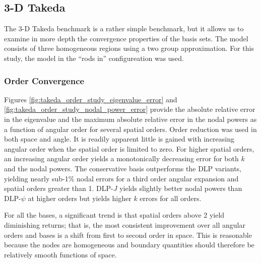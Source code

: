 \subsection{3-D Takeda}

The 3-D Takeda benchmark is a rather simple benchmark, but it
allows us to examine in more depth the convergence properties of 
the basis sets.  The model consists of three homogeneous regions using 
a two group approximation.  For this study, the model in the ``rods in''
configureation was used.

\subsubsection{Order Convergence}

Figures \ref{fig:takeda_order_study_eigenvalue_error} and
\ref{fig:takeda_order_study_nodal_power_error} provide the absolute 
relative error in the eigenvalue and the maximum 
absolute relative error in the nodal powers as a function of angular 
order for several spatial orders.  Order reduction was used in 
both space and angle. It is readily apparent little 
is gained with increasing angular order when the spatial order is limited 
to zero.  For higher spatial orders, an increasing angular order 
yields a monotonically decreasing error for both $k$ and the nodal 
powers.  The conservative basis outperforms the DLP variants, yielding
nearly sub-1\% nodal errors for a third order angular expansion and 
spatial orders greater than 1.  DLP-$J$ yields slightly 
better nodal powers than DLP-$\psi$ at higher orders but yields higher 
$k$ errors for all orders. 

For all the bases, a significant trend is that spatial orders above 
2 yield diminishing returns; that is, the most consistent improvement
over all angular orders and bases is a shift from first to second order 
in space.  This is reasonable because the nodes are homogeneous and 
boundary quantities should therefore be relatively smooth functions of space.


